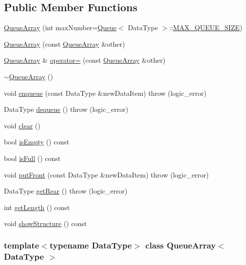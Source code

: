 \subsection*{\-Public \-Member \-Functions}
\begin{DoxyCompactItemize}
\item 
\hyperlink{class_queue_array_a112114659f8c2590872426a2dee8e6cc}{\-Queue\-Array} (int max\-Number=\hyperlink{class_queue}{\-Queue}$<$ \-Data\-Type $>$\-::\hyperlink{class_queue_aaf3eed0540baaf6609b48910aacc7133}{\-M\-A\-X\-\_\-\-Q\-U\-E\-U\-E\-\_\-\-S\-I\-Z\-E})
\item 
\hyperlink{class_queue_array_a08df206def55e930c9c561ee8bc93422}{\-Queue\-Array} (const \hyperlink{class_queue_array}{\-Queue\-Array} \&other)
\item 
\hyperlink{class_queue_array}{\-Queue\-Array} \& \hyperlink{class_queue_array_adaad55e5da06583cc786af90937a94c1}{operator=} (const \hyperlink{class_queue_array}{\-Queue\-Array} \&other)
\item 
\hyperlink{class_queue_array_ae48667f5b0894a5f22971002c4aed67e}{$\sim$\-Queue\-Array} ()
\item 
void \hyperlink{class_queue_array_a15e0632c580858c396d3aac1265fecd7}{enqueue} (const \-Data\-Type \&new\-Data\-Item)  throw (logic\-\_\-error)
\item 
\-Data\-Type \hyperlink{class_queue_array_a34d386d2323aa80b7b441d4436153a89}{dequeue} ()  throw (logic\-\_\-error)
\item 
void \hyperlink{class_queue_array_a154afbf4084cb08e3a134f2f6a33df6c}{clear} ()
\item 
bool \hyperlink{class_queue_array_ae1298c7e16e1053b628a019e71db4320}{is\-Empty} () const 
\item 
bool \hyperlink{class_queue_array_a7233d591dd81e9e3d3f6e4ad5631c81c}{is\-Full} () const 
\item 
void \hyperlink{class_queue_array_add18fcb931a244d56040a1f0a0c24a8f}{put\-Front} (const \-Data\-Type \&new\-Data\-Item)  throw (logic\-\_\-error)
\item 
\-Data\-Type \hyperlink{class_queue_array_a8bebf91214e116f74d4482bf9babee2d}{get\-Rear} ()  throw (logic\-\_\-error)
\item 
int \hyperlink{class_queue_array_a1d1bf41a4ca23c30f53296a0e0c5bf33}{get\-Length} () const 
\item 
void \hyperlink{class_queue_array_adde651b7fd7865dc4f281e21c7f1a6c3}{show\-Structure} () const 
\end{DoxyCompactItemize}
\subsubsection*{template$<$typename Data\-Type$>$ class Queue\-Array$<$ Data\-Type $>$}



